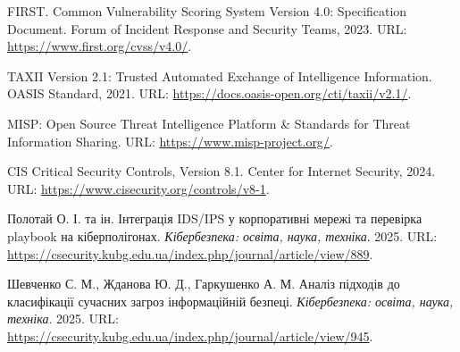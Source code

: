  FIRST. Common Vulnerability Scoring System Version 4.0: Specification Document. Forum of Incident Response and Security Teams, 2023. URL: \url{https://www.first.org/cvss/v4.0/}.

 TAXII Version 2.1: Trusted Automated Exchange of Intelligence Information. OASIS Standard, 2021. URL: \url{https://docs.oasis-open.org/cti/taxii/v2.1/}.

 MISP: Open Source Threat Intelligence Platform \& Standards for Threat Information Sharing. URL: \url{https://www.misp-project.org/}.

 CIS Critical Security Controls, Version 8.1. Center for Internet Security, 2024. URL: \url{https://www.cisecurity.org/controls/v8-1}.

 Полотай О. І. та ін. Інтеграція IDS/IPS у корпоративні мережі та перевірка playbook на кіберполігонах. \emph{Кібербезпека: освіта, наука, техніка}. 2025. URL: \url{https://csecurity.kubg.edu.ua/index.php/journal/article/view/889}.

 Шевченко С. М., Жданова Ю. Д., Гаркушенко А. М. Аналіз підходів до класифікації сучасних загроз інформаційній безпеці. \emph{Кібербезпека: освіта, наука, техніка}. 2025. URL: \url{https://csecurity.kubg.edu.ua/index.php/journal/article/view/945}.
